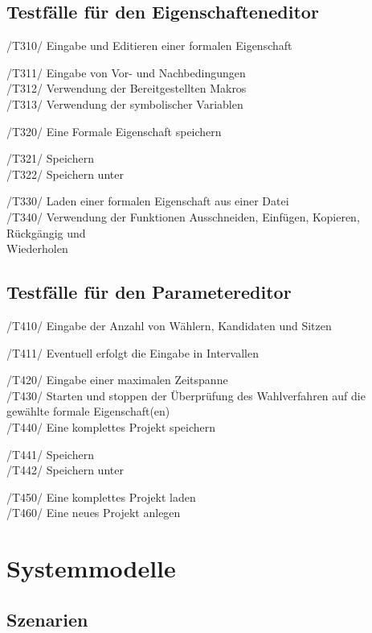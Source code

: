 \documentclass[a4paper]{scrreprt}
\begin{document}
\section{Testfälle für den Eigenschafteneditor}

/T310/ Eingabe und Editieren einer formalen Eigenschaft 
\begin{addmargin}[25pt]{0pt}
/T311/ Eingabe von Vor- und Nachbedingungen \\
/T312/ Verwendung der Bereitgestellten Makros \\
/T313/ Verwendung der symbolischer Variablen 
\end{addmargin}	
/T320/ Eine Formale Eigenschaft speichern
\begin{addmargin}[25pt]{0pt}
/T321/ Speichern \\
/T322/ Speichern unter 
\end{addmargin}	
/T330/ Laden einer formalen Eigenschaft aus einer Datei \\
/T340/ Verwendung der Funktionen Ausschneiden, Einfügen, Kopieren, Rückgängig und \\ Wiederholen
\section{Testfälle für den Parametereditor}

/T410/ Eingabe der Anzahl von Wählern, Kandidaten und Sitzen
\begin{addmargin}[25pt]{0pt}
/T411/ Eventuell erfolgt die Eingabe in Intervallen
\end{addmargin}	
/T420/ Eingabe einer maximalen Zeitspanne \\
/T430/ Starten und stoppen der Überprüfung des Wahlverfahren auf die gewählte formale Eigenschaft(en) \\
/T440/ Eine komplettes Projekt speichern 
\begin{addmargin}[25pt]{0pt}
/T441/ Speichern \\
/T442/ Speichern unter 
\end{addmargin}
/T450/ Eine komplettes Projekt laden \\
/T460/ Eine neues Projekt anlegen \\




\chapter{Systemmodelle}
\section{Szenarien}
\end{document}
